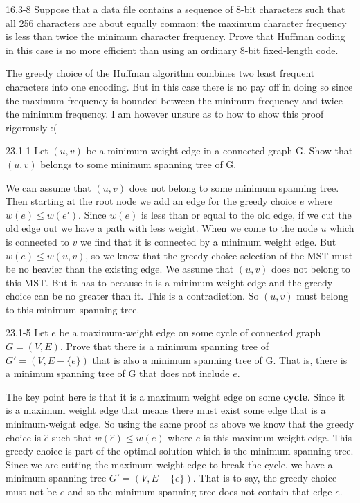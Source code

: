 \begin{problem}{16.3-8}
  Suppose that a data file contains a sequence of 8-bit characters such that all 256 characters are about equally
  common: the maximum character frequency is less than twice the minimum character frequency. Prove that Huffman coding
  in this case is no more efficient than using an ordinary 8-bit fixed-length code.
  \begin{solution}
    The greedy choice of the Huffman algorithm combines two least frequent characters into one encoding. But in this
    case there is no pay off in doing so since the maximum frequency is bounded between the minimum frequency and twice
    the minimum frequency.  I am however unsure as to how to show this proof rigorously :(
  \end{solution}
\end{problem}

\begin{problem}{23.1-1}
  Let $(u,v)$ be a minimum-weight edge in a connected graph G. Show that $(u,v)$ belongs to some minimum spanning tree
  of G.
  \begin{solution}
    We can assume that $(u,v)$ does not belong to some minimum spanning tree. Then starting at the root node we add an
    edge for the greedy choice $e$ where $w(e) \le w(e')$.  Since $w(e)$ is less than or equal to the old edge, if we
    cut the old edge out we have a path with less weight.  When we come to the node $u$ which is connected to $v$ we
    find that it is connected by a minimum weight edge. But $w(e) \le w(u,v)$, so we know that the greedy choice
    selection of the MST must be no heavier than the existing edge. We assume that $(u,v)$ does not belong to this
    MST.  But it has to because it is a minimum weight edge and the greedy choice can be no greater than it.  This is a
    contradiction. So $(u,v)$ must belong to this minimum spanning tree.
  \end{solution}
\end{problem}

\begin{problem}{23.1-5}
  Let $e$ be a maximum-weight edge on some cycle of connected graph $G = (V,E)$. Prove that there is a minimum spanning
  tree of $G' = (V,E - \{e\})$ that is also a minimum spanning tree of G. That is, there is a minimum spanning tree of G
  that does not include $e$.
  \begin{solution}
    The key point here is that it is a maximum weight edge on some \textbf{cycle}.  Since it is a maximum weight edge
    that means there must exist some edge that is a minimum-weight edge.  So using the same proof as above we know that
    the greedy choice is $\hat{e}$ such that $w(\hat{e}) \le w(e)$ where $e$ is this maximum weight edge. This greedy
    choice is part of the optimal solution which is the minimum spanning tree.  Since we are cutting the maximum weight
    edge to break the cycle, we have a minimum spanning tree $G' = (V,E - \{e\})$.  That is to say, the greedy choice
    must not be $e$ and so the minimum spanning tree does not contain that edge $e$.
  \end{solution}
\end{problem}


